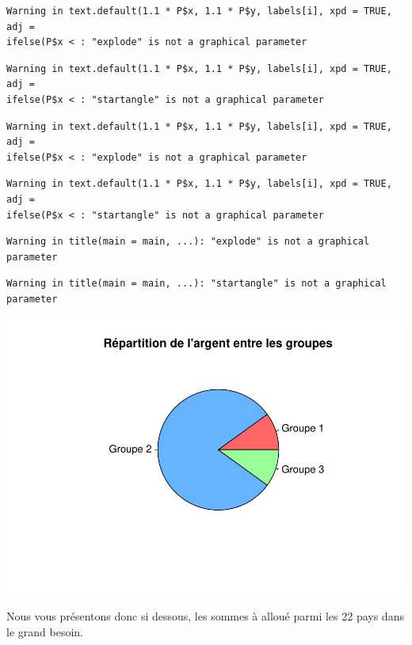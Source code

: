 \documentclass[
]{article}
\begin{document}
\begin{verbatim}
Warning in text.default(1.1 * P$x, 1.1 * P$y, labels[i], xpd = TRUE, adj =
ifelse(P$x < : "explode" is not a graphical parameter
\end{verbatim}

\begin{verbatim}
Warning in text.default(1.1 * P$x, 1.1 * P$y, labels[i], xpd = TRUE, adj =
ifelse(P$x < : "startangle" is not a graphical parameter
\end{verbatim}

\begin{verbatim}
Warning in text.default(1.1 * P$x, 1.1 * P$y, labels[i], xpd = TRUE, adj =
ifelse(P$x < : "explode" is not a graphical parameter
\end{verbatim}

\begin{verbatim}
Warning in text.default(1.1 * P$x, 1.1 * P$y, labels[i], xpd = TRUE, adj =
ifelse(P$x < : "startangle" is not a graphical parameter
\end{verbatim}

\begin{verbatim}
Warning in title(main = main, ...): "explode" is not a graphical parameter
\end{verbatim}

\begin{verbatim}
Warning in title(main = main, ...): "startangle" is not a graphical parameter
\end{verbatim}

\includegraphics{Projet_files/figure-latex/unnamed-chunk-48-1.pdf}

Nous vous présentons donc si dessous, les sommes à alloué parmi les 22
pays dans le grand besoin.
\end{document}
